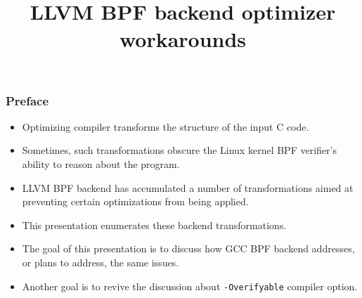 \documentclass{beamer}
\title{LLVM BPF backend optimizer workarounds}
\date{}
\newcommand{\code}[1]{\texttt{#1}}
\begin{document}
\frame{\titlepage}

\begin{frame}[fragile]
\frametitle{Preface}

\begin{itemize}
\item Optimizing compiler transforms the structure of the input C code.
\item Sometimes, such transformations obscure the Linux kernel BPF
  verifier's ability to reason about the program.
\item LLVM BPF backend has accumulated a number of transformations
  aimed at preventing certain optimizations from being applied.
\item This presentation enumerates these backend transformations.
\item The goal of this presentation is to discuss how GCC BPF backend
  addresses, or plans to address, the same issues.
\item Another goal is to revive the discussion about
  \code{-Overifyable} compiler option.
\end{itemize}



\end{frame}
\end{document}
